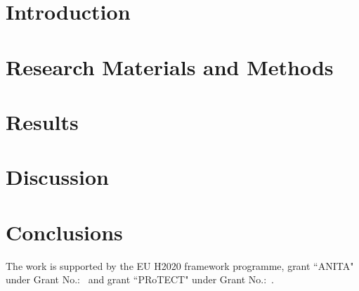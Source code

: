 \documentclass[manuscript, review, screen]{acmart}
\begin{document}
\section{Introduction}


\section{Research Materials and Methods}\label{mm}


\section{Results}\label{res}


\section{Discussion}\label{disc}


\section{Conclusions}\label{conc}


\begin{acks}
The work is supported by the EU H2020  framework programme, grant ``ANITA" under Grant No.:~ and grant ``PRoTECT" under Grant No.:~.
\end{acks}



\end{document}
